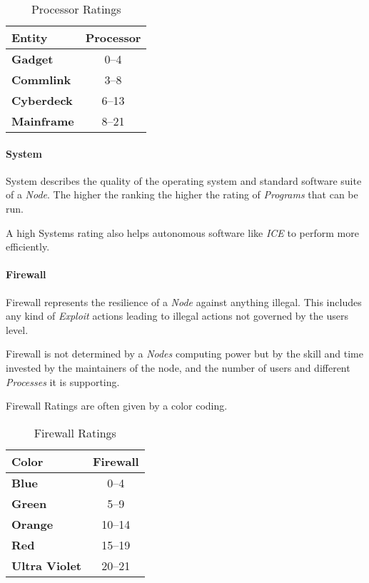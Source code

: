 \begin{table}[htb]
    \caption[Processor Ratings]{Processor Ratings}
    \label{tab:processor ratings}
    \centering
    \begin{tabular}{lc}
        \toprule
        \textbf{Entity}    & \textbf{Processor} \\
        \midrule
        \textbf{Gadget}    & 0--4               \\
        \textbf{Commlink}  & 3--8               \\
        \textbf{Cyberdeck} & 6--13              \\
        \textbf{Mainframe} & 8--21              \\
        \bottomrule
    \end{tabular}
\end{table}


\paragraph{System}

System describes the quality of the operating system and standard software
suite of a \emph{Node}. The higher the ranking the higher the rating of
\emph{Programs} that can be run.

A high Systems rating also helps autonomous software like \emph{ICE} to
perform more efficiently.


\paragraph{Firewall}

Firewall represents the resilience of a \emph{Node} against anything
illegal. This includes any kind of \emph{Exploit} actions leading to
illegal actions not governed by the users level.

Firewall is not determined by a \emph{Nodes} computing power but by
the skill and time invested by the maintainers of the node, and the
number of users and different \emph{Processes} it is supporting.

\hfill

Firewall Ratings are often given by a color coding.

\begin{table}[htb]
    \caption[Firewall Ratings]{Firewall Ratings}
    \label{tab:firwall ratings}
    \centering
    \begin{tabular}{lc}
        \toprule
        \textbf{Color}        & \textbf{Firewall} \\
        \midrule
        \textbf{Blue}         & 0--4              \\
        \textbf{Green}        & 5--9              \\
        \textbf{Orange}       & 10--14            \\
        \textbf{Red}          & 15--19            \\
        \textbf{Ultra Violet} & 20--21            \\
        \bottomrule
    \end{tabular}
\end{table}

